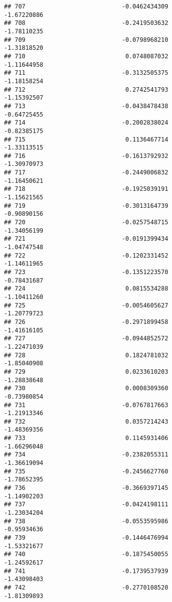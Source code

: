 \documentclass[
]{article}
\begin{document}
\begin{verbatim}
## 707                           -0.0462434309                -1.67220886
## 708                           -0.2419503632                -1.78110235
## 709                           -0.0798968210                -1.31818520
## 710                            0.0748087032                -1.11644958
## 711                           -0.3132505375                -1.18158254
## 712                            0.2742541793                -1.15392507
## 713                           -0.0438478438                -0.64725455
## 714                           -0.2002838024                -0.82385175
## 715                            0.1136467714                -1.33113515
## 716                           -0.1613792932                -1.30970973
## 717                           -0.2449006832                -1.16450621
## 718                           -0.1925039191                -1.15621565
## 719                           -0.3013164739                -0.90890156
## 720                           -0.0257548715                -1.34056199
## 721                           -0.0191399434                -1.04747548
## 722                           -0.1202331452                -1.14611965
## 723                           -0.1351223570                -0.78431687
## 724                            0.0815534288                -1.10411260
## 725                           -0.0054605627                -1.20779723
## 726                           -0.2971899458                -1.41616105
## 727                           -0.0944852572                -1.22471039
## 728                            0.1824781032                -1.85040908
## 729                            0.0233610203                -1.28838648
## 730                            0.0008309360                -0.73980854
## 731                           -0.0767817663                -1.21913346
## 732                            0.0357214243                -1.48369356
## 733                            0.1145931406                -1.66296048
## 734                           -0.2382055311                -1.36619094
## 735                           -0.2456627760                -1.78652395
## 736                           -0.3669397145                -1.14902203
## 737                           -0.0424198111                -1.23034204
## 738                           -0.0553595986                -0.95934636
## 739                           -0.1446476994                -1.53321677
## 740                           -0.1875450055                -1.24592617
## 741                           -0.1739537939                -1.43098403
## 742                           -0.2770108520                -1.81309893

\end{verbatim}
\end{document}
